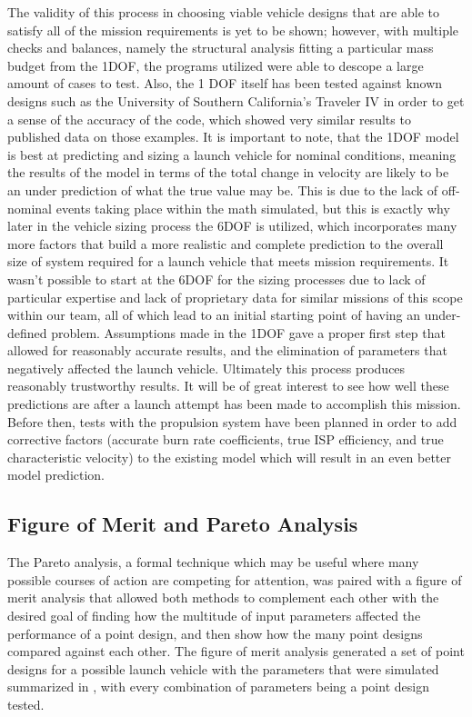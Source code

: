 The validity of this process in choosing viable vehicle designs that are able to satisfy all of the mission requirements is yet to be shown; however, with multiple checks and balances, namely the structural analysis fitting a particular mass budget from the 1DOF, the programs utilized were able to descope a large amount of cases to test. Also, the 1 DOF itself has been tested against known designs such as the University of Southern California’s Traveler IV in order to get a sense of the accuracy of the code, which showed very similar results to published data on those examples. It is important to note, that the 1DOF model is best at predicting and sizing a launch vehicle for nominal conditions, meaning the results of the model in terms of the total change in velocity are likely to be an under prediction of what the true value may be. This is due to the lack of off-nominal events taking place within the math simulated, but this is exactly why later in the vehicle sizing process the 6DOF is utilized, which incorporates many more factors that build a more realistic and complete prediction to the overall size of system required for a launch vehicle that meets mission requirements. It wasn't possible to start at the 6DOF for the sizing processes due to lack of particular expertise and lack of proprietary data for similar missions of this scope within our team, all of which lead to an initial starting point of having an under-defined problem. Assumptions made in the 1DOF gave a proper first step that allowed for reasonably accurate results, and the elimination of parameters that negatively affected the launch vehicle. Ultimately this process produces reasonably trustworthy results. It will be of great interest to see how well these predictions are after a launch attempt has been made to accomplish this mission. Before then, tests with the propulsion system have been planned in order to add corrective factors (accurate burn rate coefficients, true ISP efficiency, and true characteristic velocity) to the existing model which will result in an even better model prediction.


\subsection{Figure of Merit and Pareto Analysis}
The Pareto analysis, a formal technique which may be useful where many possible courses of action are competing for attention, was paired with a figure of merit analysis that allowed both methods to complement each other with the desired goal of finding how the multitude of input parameters affected the performance of a point design, and then show how the many point designs compared against each other. The figure of merit analysis generated a set of point designs for a possible launch vehicle with the parameters that were simulated summarized in , with every combination of parameters being a point design tested.

